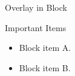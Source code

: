 \documentclass[14pt,t]{beamer-accessibility}
\begin{document}
\begin{frame}{Overlay in Block}
\begin{block}{Important Items}
\begin{itemize}
\item<1-> Block item A.
\item<2-> Block item B.
\end{itemize}
\end{block}
\end{frame}
\end{document}

